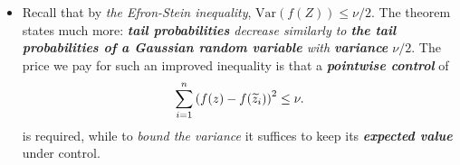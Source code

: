 \documentclass[11pt]{article}
\begin{document}
\begin{itemize}
\begin{proof}
\begin{align*}
&=  \frac{\lambda^2}{4}\E{}{e^{\lambda f(Z)}\sum_{i=1}^{n}\paren{f(Z)  - f(\widetilde{Z}_{i})}_{+}^2} \\
&\le \frac{\nu \lambda^2}{4}\E{}{e^{\lambda f(Z) }}
\end{align*} where the last inequality is from the bounded variance assumption. Thus
\begin{align*}
\frac{\text{Ent}(e^{\lambda f(Z)})}{\E{}{e^{\lambda f(Z) }}} &\le \frac{\nu \lambda^2}{4}.
\end{align*} By \emph{Herbst's argument}, the logarithmic moment generating function 
\begin{align*}
\psi(\lambda) = \log \E{}{e^{\lambda (f(Z) - \E{}{f(Z)})}} &\le \frac{\nu \lambda^2}{4}.
\end{align*} Finally, by Chernoff bound,
\begin{align*}
\bP\set{f(Z) - \E{}{f(Z)} \ge t} &\le \inf_{\lambda >0}\exp\paren{ \psi(\lambda) - \lambda t } \le \inf_{\lambda >0}\exp\paren{ \frac{\nu \lambda^2}{4} - \lambda t } = \exp\paren{- \frac{t^2}{\nu}}
\end{align*} where $\lambda^{*} = \frac{2t}{ \nu}$. \qed
\end{proof}

\item \begin{remark}
Recall that by \emph{the Efron-Stein inequality}, $\text{Var}(f(Z)) \le \nu/2$. The theorem states much
more: \emph{\textbf{tail probabilities} decrease similarly to \textbf{the tail probabilities of a Gaussian random variable} with \textbf{variance} $\nu/2$}.  The price we pay for such an improved inequality is that a \emph{\textbf{pointwise control}} of 
\begin{align*}
\sum_{i=1}^{n}\left(f(z) - f(\widetilde{z}_{i})\right)^2 \le \nu.
\end{align*} is required, while to \emph{bound the variance} it suffices to keep its \emph{\textbf{expected value}} under control. 
\end{remark}


\end{itemize}
\end{document}
